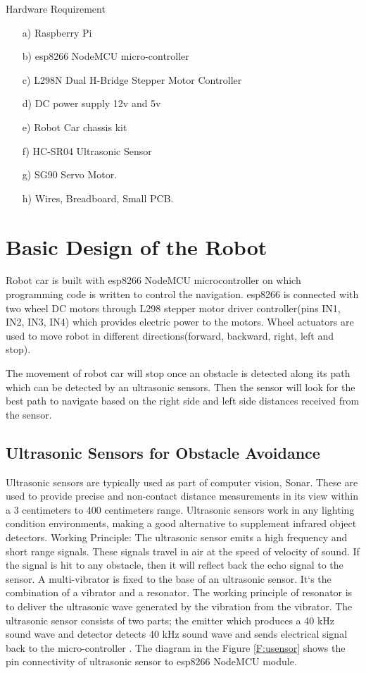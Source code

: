 \documentclass[sigconf]{acmart}
\begin{document}
Hardware Requirement
\begin{itemize}
\item[a)] Raspberry Pi
\item[b)] esp8266 NodeMCU micro-controller
\item[c)] L298N Dual H-Bridge Stepper Motor Controller
\item[d)] DC power supply 12v and 5v
\item[e)] Robot Car chassis kit
\item[f)] HC-SR04 Ultrasonic Sensor
\item[g)] SG90 Servo Motor.
\item[h)] Wires, Breadboard, Small PCB.
\end{itemize}


\section{Basic Design of the Robot}
Robot car is built with esp8266 NodeMCU microcontroller on which programming 
code is written to control the navigation. esp8266 is connected with two 
wheel DC motors through L298 stepper motor driver controller(pins IN1, IN2, IN3, IN4) 
which provides electric power to the motors. Wheel actuators are used to 
move robot in different directions(forward, backward, right, left and stop).

The movement of robot car will stop once an obstacle is detected along its path 
which can be detected by an ultrasonic sensors. Then the sensor will look for 
the best path to navigate based on the right side and left side distances 
received from the sensor.

\subsection{Ultrasonic Sensors for Obstacle Avoidance}
Ultrasonic sensors are typically used as part of computer vision, Sonar. 
These are used to provide precise and non-contact distance measurements 
in its view within a 3 centimeters to 400 centimeters range. Ultrasonic 
sensors work in any lighting condition environments, making a good 
alternative to supplement infrared object detectors.
Working Principle: The ultrasonic sensor emits a high frequency and short 
range signals. These signals travel in air at the speed of velocity of sound. 
If the signal is hit to any obstacle, then it will reflect back the echo signal
to the sensor. A multi-vibrator is fixed to the base of an ultrasonic sensor. 
It`s the combination of a vibrator and a resonator. The working principle of 
resonator is to  deliver the  ultrasonic wave generated by the vibration from 
the vibrator. The ultrasonic sensor consists of two parts; the emitter which 
produces a 40 kHz sound wave and detector detects 40 kHz sound wave and sends 
electrical signal back to the micro-controller \cite{ijedr2016}. The diagram 
in the Figure \ref{F:usensor} shows the pin connectivity of ultrasonic sensor 
to esp8266 NodeMCU module.
\end{document}
